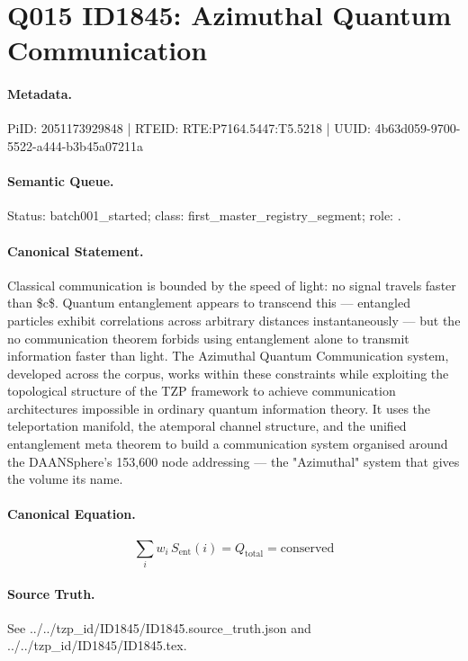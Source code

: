 \section*{Q015 ID1845: Azimuthal Quantum Communication}
\paragraph{Metadata.}
PiID: 2051173929848 | RTEID: RTE:P7164.5447:T5.5218 | UUID: 4b63d059-9700-5522-a444-b3b45a07211a

\paragraph{Semantic Queue.}
Status: batch001\_started; class: first\_master\_registry\_segment; role: .

\paragraph{Canonical Statement.}
Classical communication is bounded by the speed of light: no signal travels faster than \$c\$. Quantum entanglement appears to transcend this — entangled particles exhibit correlations across arbitrary distances instantaneously — but the no communication theorem forbids using entanglement alone to transmit information faster than light. The Azimuthal Quantum Communication system, developed across the corpus, works within these constraints while exploiting the topological structure of the TZP framework to achieve communication architectures impossible in ordinary quantum information theory. It uses the teleportation manifold, the atemporal channel structure, and the unified entanglement meta theorem to build a communication system organised around the DAANSphere's 153,600 node addressing — the "Azimuthal" system that gives the volume its name.

\paragraph{Canonical Equation.}
\[
\sum_i w_i\, S_\text{ent}(i) = Q_\text{total} = \text{conserved}
\]

\paragraph{Source Truth.}
See ../../tzp\_id/ID1845/ID1845.source\_truth.json and ../../tzp\_id/ID1845/ID1845.tex.
